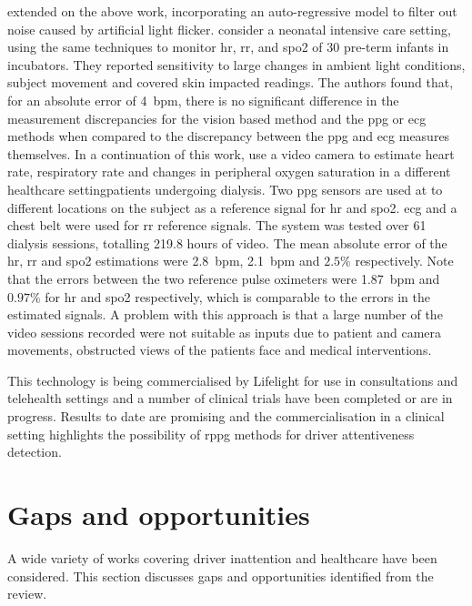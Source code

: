 \documentclass[11pt, parskip=half*,twoside=false]{scrbook}
\begin{document}
{\citet{tarassenkoNoncontactVideobasedVital2014} extended on the above work, incorporating an auto-regressive model to filter out noise caused by artificial light flicker. \citet{villarroelContinuousNoncontactVital2014} consider a  neonatal intensive care setting, using the same techniques to monitor \gls{hr}, \gls{rr}, and \gls{spo2} of 30 pre-term infants in incubators. They reported sensitivity to large changes in ambient light conditions, subject movement and covered skin impacted readings. The authors found that, for an absolute error of 4~\gls{bpm}, there is no significant difference in the measurement discrepancies for the vision based method and the \gls{ppg} or \gls{ecg} methods when compared to the discrepancy between the \gls{ppg} and \gls{ecg} measures themselves. In a continuation of this work, \citet{villarroelNonContactVitalSign2017} use a video camera to estimate heart rate, respiratory rate and changes in peripheral oxygen saturation in a different healthcare setting\textemdash patients undergoing dialysis. Two \gls{ppg} sensors are used at to different locations on the subject as a reference signal for \gls{hr} and \gls{spo2}. \gls{ecg} and a chest belt were used for \gls{rr} reference signals. The system was tested over 61 dialysis sessions, totalling 219.8 hours of video. The mean absolute error of the \gls{hr}, \gls{rr} and \gls{spo2} estimations were 2.8~\gls{bpm}, 2.1~\gls{bpm} and $2.5\%$ respectively. Note that the errors between the two reference pulse oximeters were 1.87~\gls{bpm} and $0.97\%$ for \gls{hr} and \gls{spo2} respectively, which is comparable to the errors in the estimated signals.  A problem with this approach is that a large number of the video sessions recorded were not suitable as inputs due to patient and camera movements, obstructed views of the patients face and medical interventions. 

This technology is being commercialised by Lifelight \citep{ximlimitedLifelightXimLimited2021} for use in consultations and telehealth settings and a number of clinical trials have been completed or are in progress. Results to date are  promising and the commercialisation in a clinical setting highlights the possibility of \gls{rppg} methods for driver attentiveness detection.

\section{Gaps and opportunities}
A wide variety of works covering driver inattention and healthcare have been considered. This section discusses gaps and opportunities identified from the review.

}
\end{document}
